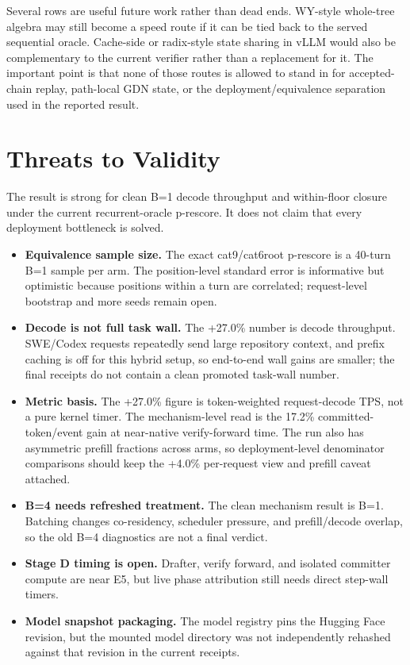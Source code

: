 \documentclass[conference]{IEEEtran}
\begin{document}
Several rows are useful future work rather than dead ends. WY-style whole-tree algebra may still become a speed route if it can be tied back to the served sequential oracle. Cache-side or radix-style state sharing in vLLM would also be complementary to the current verifier rather than a replacement for it. The important point is that none of those routes is allowed to stand in for accepted-chain replay, path-local GDN state, or the deployment/equivalence separation used in the reported result.

\section{Threats to Validity}

The result is strong for clean B=1 decode throughput and within-floor closure under the current recurrent-oracle p-rescore. It does not claim that every deployment bottleneck is solved.

\begin{itemize}[leftmargin=*,noitemsep]
    \item \textbf{Equivalence sample size.} The exact cat9/cat6root p-rescore is a 40-turn B=1 sample per arm. The position-level standard error is informative but optimistic because positions within a turn are correlated; request-level bootstrap and more seeds remain open.
    \item \textbf{Decode is not full task wall.} The +27.0\% number is decode throughput. SWE/Codex requests repeatedly send large repository context, and prefix caching is off for this hybrid setup, so end-to-end wall gains are smaller; the final receipts do not contain a clean promoted task-wall number.
    \item \textbf{Metric basis.} The +27.0\% figure is token-weighted request-decode TPS, not a pure kernel timer. The mechanism-level read is the 17.2\% committed-token/event gain at near-native verify-forward time. The run also has asymmetric prefill fractions across arms, so deployment-level denominator comparisons should keep the +4.0\% per-request view and prefill caveat attached.
    \item \textbf{B=4 needs refreshed treatment.} The clean mechanism result is B=1. Batching changes co-residency, scheduler pressure, and prefill/decode overlap, so the old B=4 diagnostics are not a final verdict.
    \item \textbf{Stage D timing is open.} Drafter, verify forward, and isolated committer compute are near E5, but live phase attribution still needs direct step-wall timers.
    \item \textbf{Model snapshot packaging.} The model registry pins the Hugging Face revision, but the mounted model directory was not independently rehashed against that revision in the current receipts.
\end{itemize}
\end{document}
